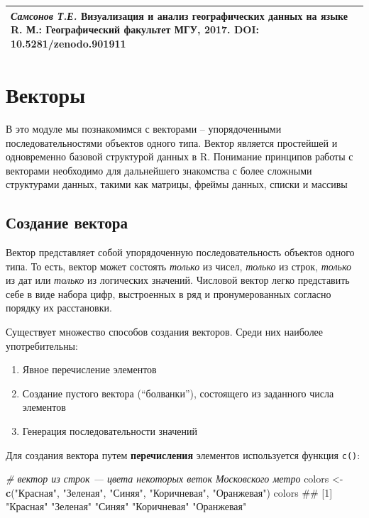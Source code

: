 \documentclass[]{book}
\newenvironment{Shaded}{\begin{snugshade}}{\end{snugshade}}
\newcommand{\KeywordTok}[1]{\textcolor[rgb]{0.13,0.29,0.53}{\textbf{#1}}}
\newcommand{\StringTok}[1]{\textcolor[rgb]{0.31,0.60,0.02}{#1}}
\newcommand{\CommentTok}[1]{\textcolor[rgb]{0.56,0.35,0.01}{\textit{#1}}}
\newcommand{\NormalTok}[1]{#1}
\providecommand{\tightlist}{%
  \setlength{\itemsep}{0pt}\setlength{\parskip}{0pt}}
\begin{document}
\begin{longtable}[]{@{}l@{}}
\toprule
\emph{Самсонов Т.Е.} \textbf{Визуализация и анализ географических данных
на языке R.} М.: Географический факультет МГУ, 2017. DOI:
10.5281/zenodo.901911\tabularnewline
\bottomrule
\end{longtable}

\chapter{Векторы}\label{vectors}

В это модуле мы познакомимся с векторами -- упорядоченными
последовательностями объектов одного типа. Вектор является простейшей и
одновременно базовой структурой данных в R. Понимание принципов работы с
векторами необходимо для дальнейшего знакомства с более сложными
структурами данных, такими как матрицы, фреймы данных, списки и массивы

\section{Создание вектора}\label{vector_creation}

Вектор представляет собой упорядоченную последовательность объектов
одного типа. То есть, вектор может состоять \emph{только} из чисел,
\emph{только} из строк, \emph{только} из дат или \emph{только} из
логических значений. Числовой вектор легко представить себе в виде
набора цифр, выстроенных в ряд и пронумерованных согласно порядку их
расстановки.

Существует множество способов создания векторов. Среди них наиболее
употребительны:

\begin{enumerate}
\def\labelenumi{\arabic{enumi}.}
\tightlist
\item
  Явное перечисление элементов
\item
  Создание пустого вектора (``болванки''), состоящего из заданного числа
  элементов
\item
  Генерация последовательности значений
\end{enumerate}

Для создания вектора путем \textbf{перечисления} элементов используется
функция \texttt{c()}:

\begin{Shaded}
\begin{Highlighting}[]
\CommentTok{# вектор из строк — цвета некоторых веток Московского метро}
\NormalTok{colors <-}\StringTok{ }\KeywordTok{c}\NormalTok{(}\StringTok{"Красная"}\NormalTok{, }\StringTok{"Зеленая"}\NormalTok{, }\StringTok{"Синяя"}\NormalTok{, }\StringTok{"Коричневая"}\NormalTok{, }\StringTok{"Оранжевая"}\NormalTok{)}
\NormalTok{colors}
\NormalTok{## [1] "Красная"    "Зеленая"    "Синяя"      "Коричневая" "Оранжевая"}
\end{Highlighting}
\end{Shaded}
\end{document}
